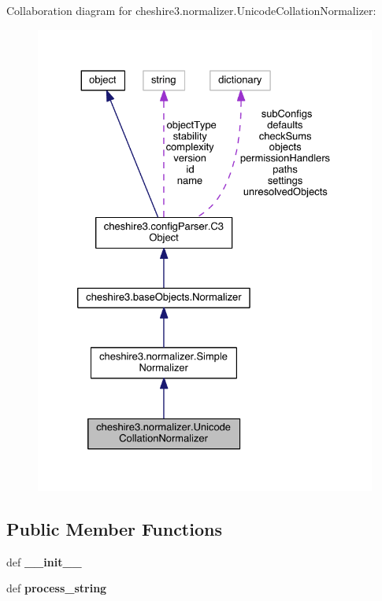 Collaboration diagram for cheshire3.\-normalizer.\-Unicode\-Collation\-Normalizer\-:
\nopagebreak
\begin{figure}[H]
\begin{center}
\leavevmode
\includegraphics[width=328pt]{classcheshire3_1_1normalizer_1_1_unicode_collation_normalizer__coll__graph}
\end{center}
\end{figure}
\subsection*{Public Member Functions}
\begin{DoxyCompactItemize}
\item 
\hypertarget{classcheshire3_1_1normalizer_1_1_unicode_collation_normalizer_a6026a989c60360d565783afac4cf530f}{def {\bfseries \-\_\-\-\_\-init\-\_\-\-\_\-}}\label{classcheshire3_1_1normalizer_1_1_unicode_collation_normalizer_a6026a989c60360d565783afac4cf530f}

\item 
\hypertarget{classcheshire3_1_1normalizer_1_1_unicode_collation_normalizer_af30908960a7c28f65b72b45207610907}{def {\bfseries process\-\_\-string}}\label{classcheshire3_1_1normalizer_1_1_unicode_collation_normalizer_af30908960a7c28f65b72b45207610907}

\end{DoxyCompactItemize}
